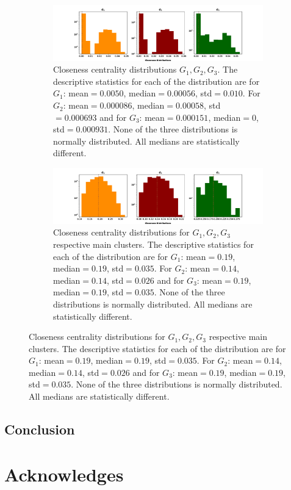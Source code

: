 \documentclass{article}
\theoremstyle{definition}
\begin{document}
\begin{figure}[!hbtp]
    \centering
    \begin{subfigure}{\textwidth}\centering
    \includegraphics[width=\textwidth]{./assets/images/closeness_distributions.pdf}
    \caption{Closeness centrality distributions \(G_1, G_2, G_3\). The descriptive
        statistics for each of the distribution are for \(G_1\): mean\(=0.0050\),
        median\(=0.00056\), std\(=0.010\). For \(G_2\): mean\(=0.000086\), median\(=0.00058\),
        std\(=0.000693\) and for \(G_3\): mean\(=0.000151\), median\(=0\), std\(=0.000931\).
        None of the three distributions is normally distributed. All medians
        are statistically different.}\label{fig:closeness_dist}
\end{subfigure}
\begin{subfigure}{\textwidth}\centering
    \centering
    \includegraphics[width=\textwidth]{./assets/images/closeness_distributions_clusters.pdf}
    \caption{Closeness centrality distributions for \(G_1, G_2, G_3\) respective
    main clusters. The descriptive statistics for each of the distribution are
    for \(G_1\): mean\(=0.19\),
    median\(=0.19\), std\(=0.035\). For \(G_2\): mean\(=0.14\), median\(=0.14\),
    std\(=0.026\) and for \(G_3\): mean\(=0.19\), median\(=0.19\), std\(=0.035\).
    None of the three distributions is normally distributed. All medians
    are statistically different.}\label{fig:closeness_dist_cluster}
    \end{subfigure}
\end{figure}

\subsection{Conclusion}
%
\section{Acknowledges}
\end{document}
